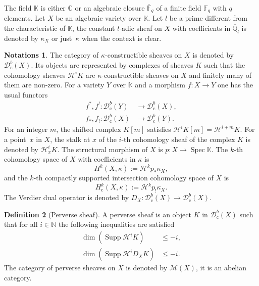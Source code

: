 \documentclass[JEP,XML,SOM,NoEqCountersInSection,Unicode,published]{cedram}
\newcommand{\rc}{\mathrm{c}}
\theoremstyle{definition}
\newtheorem{definition}{Definition}[section]
\newtheorem{notations}[definition]{Notations}
\theoremstyle{plain}
\DeclareMathOperator{\Spec}{Spec}
\DeclareMathOperator{\supp}{Supp}
\newcommand\KK{\mathbb K }
\newcommand{\C}{\mathbb{C}}
\newcommand{\qlbar}{\overline{\mathbb{Q}}_l}
\newcommand{\Fq}{\mathbb{F}_q}
\newcommand{\Fqbar}{\overline{\mathbb{F}}_q}
\newcommand{\NN}{\mathbb N}
\newcommand{\dcb}[1]{\mathcal{D}_\rc^b(#1)}
\newcommand{\hi}{\mathcal H ^i}
\begin{document}
The field $\KK$ is either $\C$ or an algebraic closure $\Fqbar$ of a finite field $\Fq$ with $q$ elements. Let $X$ be an algebraic variety over $\KK$. Let $l$ be a prime different from the characteristic of $\KK$, the constant $l$-adic sheaf on $X$ with coefficients in $\qlbar$ is denoted by $\kappa_X$ or just~$\kappa$ when the context is clear.

\begin{notations}
The category of $\kappa$-constructible sheaves on $X$ is denoted by $\dcb{X}$. Its objects are represented by complexes of sheaves $K$ such that the cohomology sheaves $\mathcal H ^i K$ are $\kappa$-constructible sheaves on $X$ and finitely many of them are non-zero. For a variety $Y$ over $\KK$ and a morphism $f:X\to Y$ one has the usual functors
\begin{align*}
f^*, f^! : \dcb Y &\to \dcb X,\\
f_*, f_! : \dcb X &\to \dcb Y.
\end{align*}
For an integer $m$, the shifted complex $K[m]$ satisfies $\hi K[m] = \mathcal{H}^{i+m}K$. For a point~$x$ in $X$, the stalk at $x$ of the $i$-th cohomology sheaf of the complex $K$ is denoted by $\hi_x K $. The structural morphism of $X$ is $p:X\to\Spec\KK$. The $k$-th cohomology space of $X$ with coefficients in $\kappa$ is
\[
H^k(X,\kappa) := \mathcal{H}^k p_* \kappa_X,
\]
and the $k$-th compactly supported intersection cohomology space of $X$ is
\[
H^k_\rc (X,\kappa) := \mathcal{H}^k p_! \kappa_X.
\]
The Verdier dual operator is denoted by $D_X:\dcb X \to \dcb X$.
\end{notations}

\begin{definition}[Perverse sheaf]
A perverse sheaf is an object $K$ in $\dcb X$ such that for all $i\in\NN$ the following inequalities are satisfied
\begin{align*}
\dim \left(\supp \hi K\right) &\le -i, \\
\dim \left(\supp \hi D_X K\right) &\le -i.
\end{align*}
The category of perverse sheaves on $X$ is denoted by $\mathcal{M}(X)$, it is an abelian category.
\end{definition}
\end{document}
